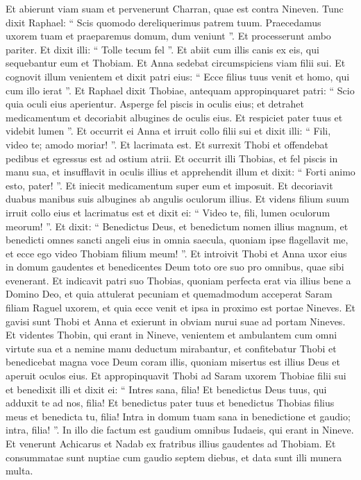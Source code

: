 \begin{biblechapter}
\begin{biblechapter}
\begin{biblechapter}
\begin{biblechapter}
\begin{biblechapter}
\begin{biblechapter}
\begin{biblechapter}
\begin{biblechapter}
\begin{biblechapter}
\begin{biblechapter}
\begin{biblechapter}
\verse Et abierunt viam suam et pervenerunt Charran, quae est contra Nineven. 
 \verse Tunc dixit Raphael: “ Scis quomodo dereliquerimus patrem tuum. 
\verse Praecedamus uxorem tuam et praeparemus domum, dum veniunt ”. 
\verse Et processerunt ambo pariter. Et dixit illi: “ Tolle tecum fel ”. Et abiit cum illis canis ex eis, qui sequebantur eum et Thobiam. 
\verse Et Anna sedebat circumspiciens viam filii sui. 
\verse Et cognovit illum venientem et dixit patri eius: “ Ecce filius tuus venit et homo, qui cum illo ierat ”. 
\verse Et Raphael dixit Thobiae, antequam appropinquaret patri: “ Scio quia oculi eius aperientur. 
 \verse Asperge fel piscis in oculis eius; et detrahet medicamentum et decoriabit albugines de oculis eius. Et respiciet pater tuus et videbit lumen ”. 
\verse Et occurrit ei Anna et irruit collo filii sui et dixit illi: “ Fili, video te; amodo moriar! ”. Et lacrimata est. 
\verse Et surrexit Thobi et offendebat pedibus et egressus est ad ostium atrii. Et occurrit illi Thobias, 
\verse et fel piscis in manu sua, et insufflavit in oculis illius et apprehendit illum et dixit: “ Forti animo esto, pater! ”. Et iniecit medicamentum super eum et imposuit. 
\verse Et decoriavit duabus manibus suis albugines ab angulis oculorum illius. 
\verse Et videns filium suum irruit collo eius 
\verse et lacrimatus est et dixit ei: “ Video te, fili, lumen oculorum meorum! ”. Et dixit: “ Benedictus Deus, et benedictum nomen illius magnum, et benedicti omnes sancti angeli eius in omnia saecula, 
\verse quoniam ipse flagellavit me, et ecce ego video Thobiam filium meum! ”. Et introivit Thobi et Anna uxor eius in domum gaudentes et benedicentes Deum toto ore suo pro omnibus, quae sibi evenerant. Et indicavit patri suo Thobias, quoniam perfecta erat via illius bene a Domino Deo, et quia attulerat pecuniam et quemadmodum acceperat Saram filiam Raguel uxorem, et quia ecce venit et ipsa in proximo est portae Nineves. Et gavisi sunt Thobi et Anna 
 \verse et exierunt in obviam nurui suae ad portam Nineves. Et videntes Thobin, qui erant in Nineve, venientem et ambulantem cum omni virtute sua et a nemine manu deductum mirabantur, 
\verse et confitebatur Thobi et benedicebat magna voce Deum coram illis, quoniam misertus est illius Deus et aperuit oculos eius. Et appropinquavit Thobi ad Saram uxorem Thobiae filii sui et benedixit illi et dixit ei: “ Intres sana, filia! Et benedictus Deus tuus, qui adduxit te ad nos, filia! Et benedictus pater tuus et benedictus Thobias filius meus et benedicta tu, filia! Intra in domum tuam sana in benedictione et gaudio; intra, filia! ”. In illo die factum est gaudium omnibus Iudaeis, qui erant in Nineve. 
\verse Et venerunt Achicarus et Nadab ex fratribus illius gaudentes ad Thobiam. Et consummatae sunt nuptiae cum gaudio septem diebus, et data sunt illi munera multa.
 

\end{biblechapter}
\end{biblechapter}
\end{biblechapter}
\end{biblechapter}
\end{biblechapter}
\end{biblechapter}
\end{biblechapter}
\end{biblechapter}
\end{biblechapter}
\end{biblechapter}
\end{biblechapter}
